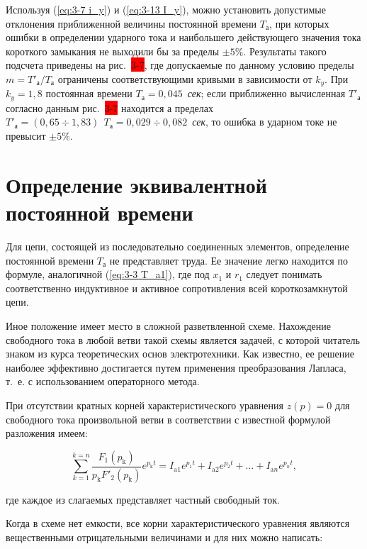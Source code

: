 Используя (\ref{eq:3-7 i_y}) и (\ref{eq:3-13 I_y}), можно установить допустимые отклонения приближенной величины постоянной времени $ T_{\text{а}} $, при которых ошибки в определении ударного тока и наибольшего действующего значения тока короткого замыкания не выходили бы за пределы $ \pm5 \% $. Результаты такого подсчета приведены на рис.~\colorbox{red}{3-7}, где допускаемые по данному условию пределы $ m = T'_{\text{а}} / T_{\text{а}} $ ограничены соответствующими кривыми в зависимости от $ k_y $. При $ k_y = 1,8 $ постоянная времени $ T_{\text{а}} = 0,045 $~\textit{сек}; если приближенно вычисленная $ T'_{\text{а}} $ согласно данным рис.~\colorbox{red}{3-7} находится а пределах $ T'_{\text{а}} = (0,65 \div 1,83)~~T_{\text{а}} = 0,029 \div 0,082 $~\textit{сек}, то ошибка в ударном токе не превысит $ \pm5 \% $.

\section{Определение эквивалентной постоянной времени}

Для цепи, состоящей из последовательно соединенных элементов, определение постоянной времени $ T_{\text{а}} $ не представляет труда. Ее значение легко находится по формуле, аналогичной (\ref{eq:3-3 T_a1}), где под $ x_1 $ и $ r_1 $ следует понимать соответственно индуктивное и активное сопротивления всей короткозамкнутой цепи.

Иное положение имеет место в сложной разветвленной схеме. Нахождение свободного тока в любой ветви такой схемы является задачей, с которой читатель знаком из курса теоретических основ электротехники. Как известно, ее решение наиболее эффективно достигается путем применения преобразования Лапласа, т.~е. с использованием операторного метода.

При отсутствии кратных корней характеристического уравнения $ z(p)= 0 $ для свободного тока произвольной ветви в соответствии с известной формулой разложения имеем:

\begin{equation}
	\sum_{k=1}^{k=n}\frac{F_1 (p_{\text{k}})}{p_{\text{k}} F'_2(p_{\text{k}})} e^{p_{\text{k}}t} = I_{\text{a}1}e^{p_1t} + I_{\text{a}2}e^{p_2t} + \ldots + I_{\text{a}n}e^{p_nt},
	\label{eq:3-15 diff}
\end{equation}

где каждое из слагаемых представляет частный свободный ток.

Когда в схеме нет емкости, все корни характеристического уравнения являются вещественными отрицательными величинами и для них можно написать:

